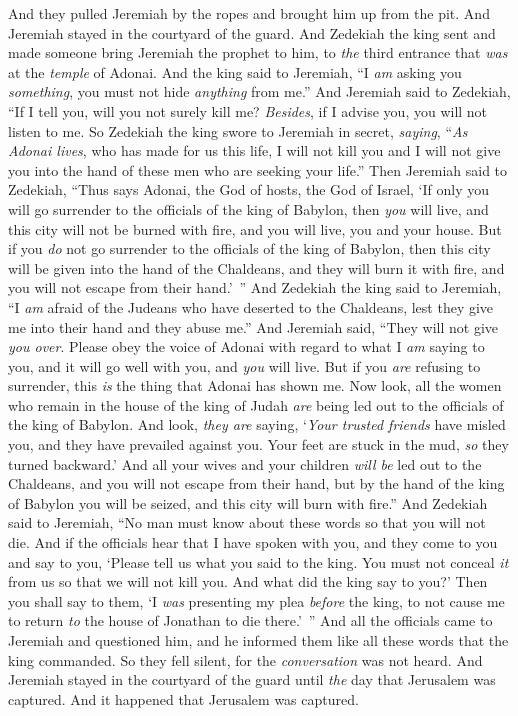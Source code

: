 \begin{biblechapter}
\verse And they pulled Jeremiah by the ropes and brought him up from the pit. And Jeremiah stayed in the courtyard of the guard.
\verse And Zedekiah the king sent and made someone bring Jeremiah the prophet to him, to \textit{the} third entrance that \textit{was} at the \textit{temple} of Adonai. And the king said to Jeremiah, “I \textit{am} asking you \textit{something}, you must not hide \textit{anything} from me.”
\verse And Jeremiah said to Zedekiah, “If I tell you, will you not surely kill me? \textit{Besides}, if I advise you, you will not listen to me.
\verse So Zedekiah the king swore to Jeremiah in secret, \textit{saying}, “\textit{As Adonai lives}, who has made for us this life, I will not kill you and I will not give you into the hand of these men who are seeking your life.”
\verse Then Jeremiah said to Zedekiah, “Thus says Adonai, the God of hosts, the God of Israel, ‘If only you will go surrender to the officials of the king of Babylon, then \textit{you} will live, and this city will not be burned with fire, and you will live, you and your house.
\verse But if you \textit{do} not go surrender to the officials of the king of Babylon, then this city will be given into the hand of the Chaldeans, and they will burn it with fire, and you will not escape from their hand.’ ”
\verse And Zedekiah the king said to Jeremiah, “I \textit{am} afraid of the Judeans who have deserted to the Chaldeans, lest they give me into their hand and they abuse me.”
\verse And Jeremiah said, “They will not give \textit{you over}. Please obey the voice of Adonai with regard to what I \textit{am} saying to you, and it will go well with you, and \textit{you} will live.
\verse But if you \textit{are} refusing to surrender, this \textit{is} the thing that Adonai has shown me.
\verse Now look, all the women who remain in the house of the king of Judah \textit{are} being led out to the officials of the king of Babylon. And look, \textit{they are} saying, ‘\textit{Your trusted friends} have misled you, 
and they have prevailed against you. 
Your feet are stuck in the mud, 
\textit{so} they turned backward.’
\verse And all your wives and your children \textit{will be} led out to the Chaldeans, and you will not escape from their hand, but by the hand of the king of Babylon you will be seized, and this city will burn with fire.”
\verse And Zedekiah said to Jeremiah, “No man must know about these words so that you will not die.
\verse And if the officials hear that I have spoken with you, and they come to you and say to you, ‘Please tell us what you said to the king. You must not conceal \textit{it} from us so that we will not kill you. And what did the king say to you?’
\verse Then you shall say to them, ‘I \textit{was} presenting my plea \textit{before} the king, to not cause me to return \textit{to} the house of Jonathan to die there.’ ”
\verse And all the officials came to Jeremiah and questioned him, and he informed them like all these words that the king commanded. So they fell silent, for the \textit{conversation} was not heard.
\verse And Jeremiah stayed in the courtyard of the guard until \textit{the} day that Jerusalem was captured. And it happened that Jerusalem was captured.
\end{biblechapter}

